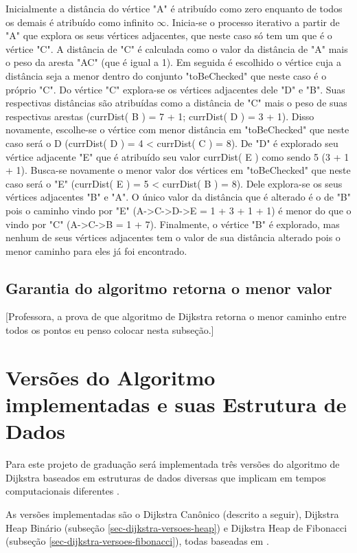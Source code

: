 Inicialmente a distância do vértice "A" é atribuído como zero enquanto de todos os demais é atribuído como infinito $\infty$. Inicia-se o processo iterativo a partir de "A" que explora os seus vértices adjacentes, que neste caso só tem um que é o vértice "C". A distância de "C" é calculada como o valor da distância de "A" mais o peso da aresta "AC" (que é igual a 1). Em seguida é escolhido o vértice cuja a distância seja a menor dentro do conjunto "toBeChecked" que neste caso é o próprio "C". Do vértice "C" explora-se os vértices adjacentes dele "D" e "B". Suas respectivas distâncias são atribuídas como a distância de "C" mais o peso de suas respectivas arestas (currDist( B ) = 7 + 1; currDist( D ) = 3 + 1). Disso novamente, escolhe-se o vértice com menor distância em "toBeChecked" que neste caso será o D (currDist( D ) = 4 < currDist( C ) = 8). De "D" é explorado seu vértice adjacente "E" que é atribuído seu valor currDist( E ) como sendo 5 (3 + 1 + 1). Busca-se novamente o menor valor dos vértices em "toBeChecked" que neste caso será o "E" (currDist( E ) = 5 < currDist( B ) = 8). Dele explora-se os seus vértices adjacentes "B" e "A". O único valor da distância que é alterado é o de "B" pois o caminho vindo por "E" (A->C->D->E = 1 + 3 + 1 + 1) é menor do que o vindo por "C"  (A->C->B = 1 + 7). Finalmente, o vértice "B" é explorado, mas nenhum de seus vértices adjacentes tem o valor de sua distância alterado pois o menor caminho para eles já foi encontrado.


\subsection{Garantia do algoritmo retorna o menor valor}
\label{sec-dijkstra-algoritmo-prova}
[Professora, a prova de que algoritmo de Dijkstra retorna o menor caminho entre todos os pontos eu penso colocar nesta subseção.]

\section{Versões do Algoritmo implementadas e suas Estrutura de Dados}
\label{sec-dijkstra-versoes}
Para este projeto de graduação será implementada três versões do algoritmo de Dijkstra baseados em estruturas de dados diversas que implicam em tempos computacionais diferentes \cite{cormen2009introduction}.

As versões implementadas são o Dijkstra Canônico (descrito a seguir), Dijkstra Heap Binário (subseção \ref{sec-dijkstra-versoes-heap}) e Dijkstra Heap de Fibonacci (subseção \ref{sec-dijkstra-versoes-fibonacci}), todas baseadas em .

